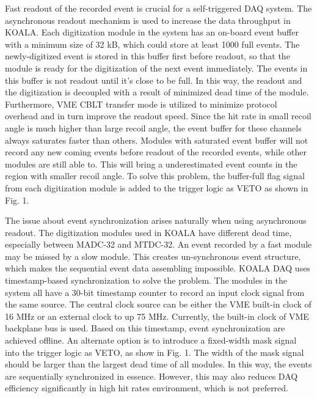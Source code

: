 \documentclass[11pt]{article}
\begin{document}
Fast readout of the recorded event is crucial for a self-triggered DAQ system.
The asynchronous readout mechanism is used to increase the data throughput in KOALA.
Each digitization module in the system has an on-board event buffer with a minimum size of 32 kB, which could store at least 1000 full events.
The newly-digitized event is stored in this buffer first before readout, so that the module is ready for the digitization of the next event immediately.
The events in this buffer is not readout until it's close to be full. In this way, the readout and the digitization is decoupled with a result of minimized dead time of the module.
Furthermore, VME CBLT transfer mode is utilized to minimize protocol overhead and in turn improve the readout speed.
Since the hit rate in small recoil angle is much higher than large recoil angle, the event buffer for these channels always saturates faster than others.
Modules with saturated event buffer will not record any new coming events before readout of the recorded events, while other modules are still able to.
This will bring a underestimated event counts in the region with smaller recoil angle.
To solve this problem, the buffer-full flag signal from each digitization module is added to the trigger logic as VETO as shown in Fig. 1.

The issue about event synchronization arises naturally when using asynchronous readout.
The digitization modules used in KOALA have different dead time, especially between MADC-32 and MTDC-32.
An event recorded by a fast module may be missed by a slow module. This creates un-synchronous event structure, which makes the sequential event data assembling impossible. 
KOALA DAQ uses timestamp-based synchronization to solve the problem.
The modules in the system all have a 30-bit timestamp counter to record an input clock signal from the same source.
The central clock source can be either the VME built-in clock of 16 MHz or an external clock to up 75 MHz.
Currently, the built-in clock of VME backplane bus is used. Based on this timestamp, event synchronization are achieved offline.
An alternate option is to introduce a fixed-width mask signal into the trigger logic as VETO, as show in Fig. 1.
The width of the mask signal should be larger than the largest dead time of all modules.
In this way, the events are sequentially synchronized in essence. 
However, this may also reduces DAQ efficiency significantly in high hit rates environment, which is not preferred.
\end{document}

